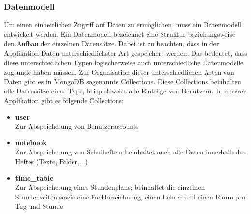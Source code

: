 \subsubsection{Datenmodell}
Um einen einheitlichen Zugriff auf Daten zu ermöglichen, muss ein Datenmodell entwickelt werden. Ein Datenmodell bezeichnet eine Struktur beziehungsweise den Aufbau der einzelnen Datensätze. Dabei ist zu beachten, dass in der Applikation Daten unterschiedlichster Art gespeichert werden. Das bedeutet, dass diese unterschiedlichen Typen logischerweise auch unterschiedliche Datenmodelle zugrunde haben müssen. Zur Organisation dieser unterschiedlichen Arten von Daten gibt es in MongoDB sogenannte Collections. Diese Collections beinhalten alle Datensätze eines Typs, beispielsweise alle Einträge von Benutzern. In unserer Applikation gibt es folgende Collections:
\begin{itemize}
\item \textbf{user}\\ Zur Abspeicherung von Benutzeraccounts
\item \textbf{notebook}\\ Zur Abspeicherung von Schulheften; beinhaltet auch alle Daten innerhalb des Heftes (Texte, Bilder,...)
\item \textbf{time\_table}\\ Zur Abspeicherung eines Stundenplans; beinhaltet die einzelnen Stundenzeiten sowie eine Fachbezeichnung, einen Lehrer und einen Raum pro Tag und Stunde
\end{itemize}

